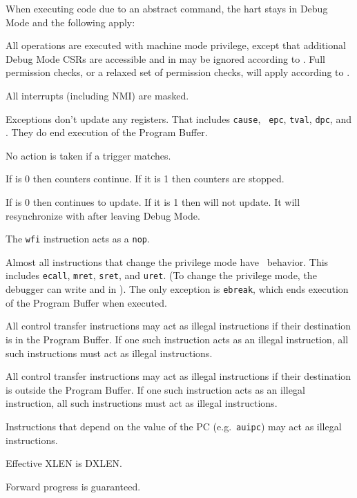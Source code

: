 \begin{steps}{When executing code due to an abstract command, the hart stays in
    Debug Mode and the following apply:}
\item All operations are executed with machine mode privilege, except that
    additional Debug Mode CSRs are accessible and
    \FcsrMstatusMprv in \Rmstatus may be ignored according to \FcsrDcsrMprven.
    Full permission checks, or a relaxed set of permission checks, will apply
    according to \FdmAbstractcsRelaxedpriv.
\item All interrupts (including NMI) are masked.
\item Exceptions don't update any registers.  That includes {\tt cause}, {\tt
    epc}, {\tt tval}, {\tt dpc}, and \Rmstatus. They do end execution of the
    Program Buffer.
\item No action is taken if a trigger matches.
\item If \FcsrDcsrStopcount is 0 then counters continue. If it is 1 then
    counters are stopped.
\item If \FcsrDcsrStoptime is 0 then \Rtime continues to update. If
    it is 1 then \Rtime will not update. It will resynchronize with
    \Rmtime after leaving Debug Mode.
\item The {\tt wfi} instruction acts as a {\tt nop}.
\item Almost all instructions that change the privilege mode have \unspecified\
    behavior.  This includes {\tt ecall}, {\tt mret}, {\tt sret}, and {\tt uret}.
    (To change the privilege mode, the debugger can write
    \FcsrDcsrPrv and \FcsrDcsrV in \RcsrDcsr). The only exception is {\tt ebreak}, which ends
    execution of the Program Buffer when executed.
\item All control transfer instructions may act as illegal instructions if
    their destination is in the Program Buffer. If one such instruction acts as
    an illegal instruction, all such instructions must act as illegal
    instructions.
\item All control transfer instructions may act as illegal instructions if
    their destination is outside the Program Buffer. If one such instruction
    acts as an illegal instruction, all such instructions must act as
    illegal instructions.
\item Instructions that depend on the value of the PC (e.g.\ {\tt auipc}) may act
    as illegal instructions.
\item Effective XLEN is DXLEN.
\item Forward progress is guaranteed.
\end{steps}


